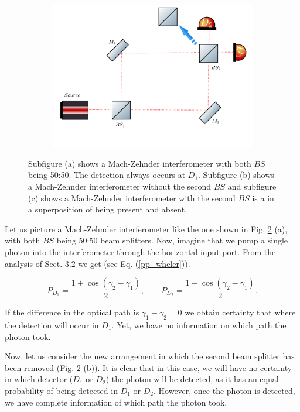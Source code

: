 \documentclass[12pt]{book}
\begin{document}
\begin{figure}[t!]
\begin{subfigure}{0.45\linewidth}
\includegraphics[width=\linewidth]{images/wheeler3.png}
\caption{}
\label{wheeler3}
\end{subfigure}
\caption{Subfigure (a) shows a Mach-Zehnder interferometer with both $BS$ being 50:50. The detection always occurs at $D_{1}$. Subfigure (b) shows a Mach-Zehnder interferometer without the second $BS$ and subfigure (c) shows a Mach-Zehnder interferometer with the second $BS$ is a in a superposition of being present and absent.}
\label{Wheeler}
\end{figure}

Let us picture a Mach-Zehnder interferometer like the one shown in Fig. \ref{Wheeler} (a), with both $BS$ being 50:50 beam splitters. Now, imagine that we pump a single photon into the interferometer through the horizontal input port. From the analysis of Sect. 3.2 we get (see Eq. (\ref{pp_wheler})).

\begin{equation}
P_{D_{1}}=\frac{1+\cos(\gamma_{2}-\gamma_{1})}{2}, \qquad P_{D_{2}}=\frac{1-\cos(\gamma_{2}-\gamma_{1})}{2}. \label{pp_wheler}
\end{equation}

 If the difference in the optical path is $\gamma_{1}-\gamma_{2}=0$  we obtain certainty that where the detection will occur in $D_{1}$. Yet, we have no information on which path the photon took.



Now, let us consider the new arrangement in which the second beam splitter has been removed (Fig. \ref{Wheeler} (b)). It is clear that in this case, we will have no certainty in which detector ($D_{1}$ or $D_{2}$) the photon will be detected, as it has an equal probability of being detected in $D_{1}$ or $D_{2}$. However, once the photon is detected, we have complete information of which path the photon took.
\end{document}
